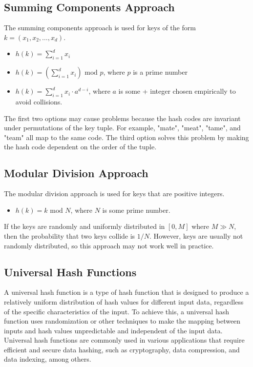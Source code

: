 \documentclass[12pt]{article}
\newcommand{\1}{\space \quad}
\newcommand{\2}{\quad \quad \quad}
\newcommand{\3}{\quad \quad \quad \quad \space}
\newcommand{\4}{\quad \quad \quad \quad \quad \quad}
\begin{document}
\subsection{Summing Components Approach}
The summing components approach is used for keys of the form $k = (x_1, x_2, \ldots, x_d)$.
\begin{itemize}
\item $h(k) = \sum\limits_{i=1}^{d} x_i$
\item $h(k) = (\sum\limits_{i=1}^{d} x_i) \text{ mod } p$, where $p$ is a prime number
\item $h(k) = \sum\limits_{i=1}^{d} x_i \cdot a^{d-i}$, where $a$ is some + integer chosen empirically to avoid collisions.
\end{itemize}
The first two options may cause problems because the hash codes are invariant under permutations of the key tuple. For example, "mate", "meat", "tame", and "team" all map to the same code. The third option solves this problem by making the hash code dependent on the order of the tuple.

\subsection{Modular Division Approach}
The modular division approach is used for keys that are positive integers.
\begin{itemize}
\item $h(k) = k \text{ mod } N$, where $N$ is some prime number.
\end{itemize}
If the keys are randomly and uniformly distributed in $[0, M]$ where $M \gg N$, then the probability that two keys collide is $1/N$. However, keys are usually not randomly distributed, so this approach may not work well in practice.
\subsection{Universal Hash Functions}
A universal hash function is a type of hash function that is designed to produce a relatively uniform distribution of hash values for different input data, regardless of the specific characteristics of the input. To achieve this, a universal hash function uses randomization or other techniques to make the mapping between inputs and hash values unpredictable and independent of the input data.
Universal hash functions are commonly used in various applications that require efficient and secure data hashing, such as cryptography, data compression, and data indexing, among others.
\end{document}
